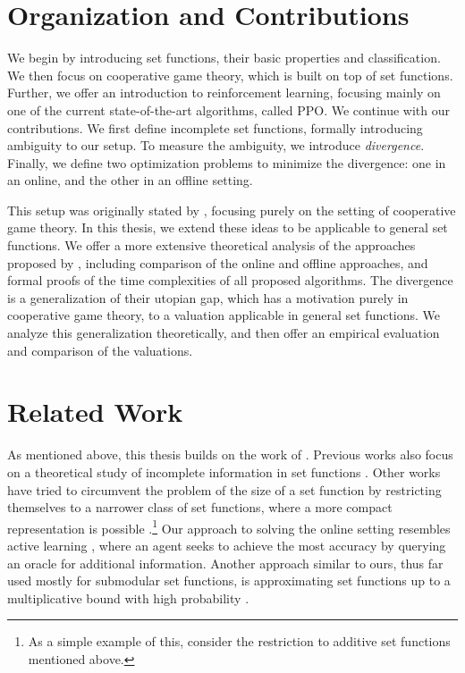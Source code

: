 \section*{Organization and Contributions}

We begin by introducing set functions, their basic properties and classification.
We then focus on cooperative game theory, which is built on top of set functions.
Further, we offer an introduction to reinforcement learning, focusing mainly on one of the current state-of-the-art algorithms, called PPO.
We continue with our contributions.
We first define incomplete set functions, formally introducing ambiguity to our setup.
To measure the ambiguity, we introduce \emph{divergence}.
Finally, we define two optimization problems to minimize the divergence: one in an online, and the other in an offline setting.

This setup was originally stated by \cite{uradnik2024reducing}, focusing purely on the setting of cooperative game theory.
In this thesis, we extend these ideas to be applicable to general set functions.
We offer a more extensive theoretical analysis of the approaches proposed by \cite{uradnik2024reducing}, including comparison of the online and offline approaches, and formal proofs of the time complexities of all proposed algorithms.
The divergence is a generalization of their utopian gap, which has a motivation purely in cooperative game theory, to a valuation applicable in general set functions.
We analyze this generalization theoretically, and then offer an empirical evaluation and comparison of the valuations.

\section*{Related Work}

As mentioned above, this thesis builds on the work of \cite{uradnik2024reducing}.
Previous works also focus on a theoretical study of incomplete information in set functions \citep{Seshadhri2010IsST,CERNY202462,Bok2023,RePEc:spr:fuzodm:v:15:y:2016:i:3:d:10.1007_s10700-015-9229-1,Cerny2023}.
Other works have tried to circumvent the problem of the size of a set function by restricting themselves to a narrower class of set functions, where a more compact representation is possible \citep{Chalkiadakis2012}.\footnote{As a simple example of this, consider the restriction to additive set functions mentioned above.}
Our approach to solving the online setting resembles active learning \citep{settlet2009active}, where an agent seeks to achieve the most accuracy by querying an oracle for additional information.
Another approach similar to ours, thus far used mostly for submodular set functions, is approximating set functions up to a multiplicative bound with high probability \citep{10.5555/1496770.1496829,10.1145/3039871}.
